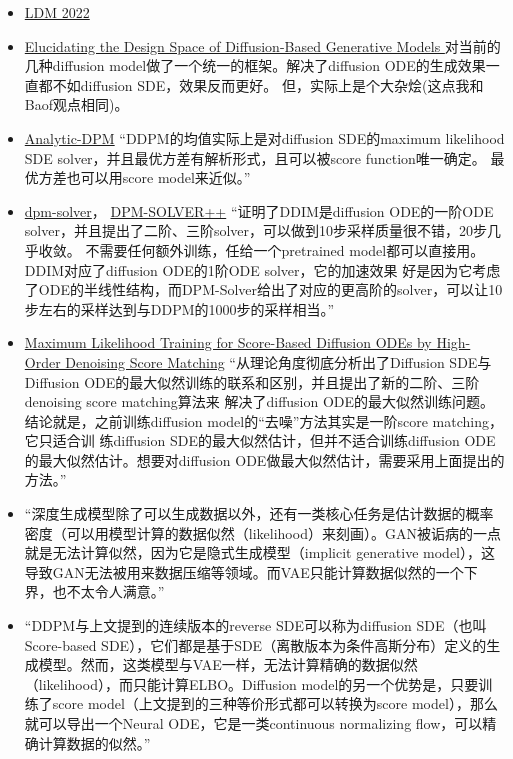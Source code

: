 \documentclass[lang=cn,newtx,10pt,scheme=chinese]{elegantbook}
\begin{document}
\begin{itemize}
  \item \href{https://arxiv.org/abs/2112.10752}{LDM 2022} 
  
  \item \href{https://arxiv.org/pdf/2206.00364.pdf}{Elucidating the Design Space of Diffusion-Based Generative Models }
  对当前的几种diffusion model做了一个统一的框架。解决了diffusion ODE的生成效果一直都不如diffusion SDE，效果反而更好。
  但，实际上是个大杂烩(这点我和Baof观点相同)。
  \item \href{https://arxiv.org/abs/2201.06503}{Analytic-DPM}
  “DDPM的均值实际上是对diffusion SDE的maximum likelihood SDE solver，并且最优方差有解析形式，且可以被score function唯一确定。
  最优方差也可以用score model来近似。”
  \item \href{https://github.com/LuChengTHU/dpm-solver}{dpm-solver}， 
  \href{https://arxiv.org/pdf/2211.01095.pdf}{DPM-SOLVER++}
  “证明了DDIM是diffusion ODE的一阶ODE solver，并且提出了二阶、三阶solver，可以做到10步采样质量很不错，20步几乎收敛。
  不需要任何额外训练，任给一个pretrained model都可以直接用。 DDIM对应了diffusion ODE的1阶ODE solver，它的加速效果
  好是因为它考虑了ODE的半线性结构，而DPM-Solver给出了对应的更高阶的solver，可以让10步左右的采样达到与DDPM的1000步的采样相当。”
  \item \href{https://arxiv.org/pdf/2206.08265.pdf}{Maximum Likelihood Training for Score-Based Diffusion ODEs by High-Order Denoising Score Matching} 
  “从理论角度彻底分析出了Diffusion SDE与Diffusion ODE的最大似然训练的联系和区别，并且提出了新的二阶、三阶denoising score matching算法来
  解决了diffusion ODE的最大似然训练问题。结论就是，之前训练diffusion model的“去噪”方法其实是一阶score matching，它只适合训
  练diffusion SDE的最大似然估计，但并不适合训练diffusion ODE的最大似然估计。想要对diffusion ODE做最大似然估计，需要采用上面提出的方法。”
  \item “深度生成模型除了可以生成数据以外，还有一类核心任务是估计数据的概率密度（可以用模型计算的数据似然（likelihood）来刻画）。GAN被诟病的一点就是无法计算似然，因为它是隐式生成模型（implicit generative model），这导致GAN无法被用来数据压缩等领域。而VAE只能计算数据似然的一个下界，也不太令人满意。”
  \item “DDPM与上文提到的连续版本的reverse SDE可以称为diffusion SDE（也叫Score-based SDE），它们都是基于SDE（离散版本为条件高斯分布）定义的生成模型。然而，这类模型与VAE一样，无法计算精确的数据似然（likelihood），而只能计算ELBO。Diffusion model的另一个优势是，只要训练了score model（上文提到的三种等价形式都可以转换为score model），那么就可以导出一个Neural ODE，它是一类continuous normalizing flow，可以精确计算数据的似然。”


\end{itemize}
\end{document}
